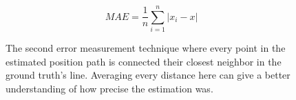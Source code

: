 \begin{equation}
    MAE = \frac{1}{n}\sum_{i = 1}^{n} \left\lvert x_i - x\right\rvert
\end{equation}

\begin{figure}
    \centering
    \resizebox{0.8\linewidth}{!}{}
    \caption{ The second error measurement technique where every point in the estimated position path is connected their closest neighbor in the ground truth's line. Averaging every distance here can give a better understanding of how precise the estimation was.}
    \label{fig:comparison}
\end{figure}
